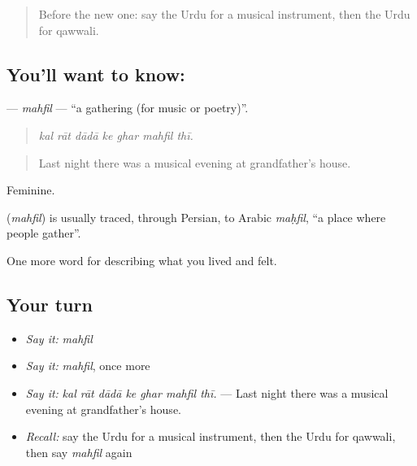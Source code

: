 \label{lesson:UR-C519-mahfil}



\begin{quote}
Before the new one: say the Urdu for a musical instrument, then the Urdu for qawwali.
\end{quote}

\subsection*{You'll want to know: }
\textbf{} — \emph{mahfil} — \textquotedblleft{}a gathering (for music or poetry)\textquotedblright{}.

\begin{quote}
      
\end{quote}

\begin{quote}
\emph{kal rāt dādā ke ghar mahfil thī.}
\end{quote}

\begin{quote}
Last night there was a musical evening at grandfather's house.
\end{quote}

Feminine.

\begin{cousinweb}
\textbf{} (\emph{mahfil}) is usually traced, through Persian, to Arabic \emph{maḥfil}, \textquotedblleft{}a place where people gather\textquotedblright{}.
\end{cousinweb}

\begin{grammarlens}[title={What you've built}]
One more word for describing what you lived and felt.
\end{grammarlens}

\subsection*{Your turn}
\begin{itemize}
\raggedright
  \item \emph{Say it:} \emph{mahfil}
  \item \emph{Say it:} \emph{mahfil}, once more
  \item \emph{Say it:} \emph{kal rāt dādā ke ghar mahfil thī.} — Last night there was a musical evening at grandfather's house.
  \item \emph{Recall:} say the Urdu for a musical instrument, then the Urdu for qawwali, then say \emph{mahfil} again
\end{itemize}

